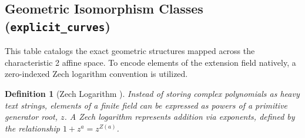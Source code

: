 \documentclass[11pt,letterpaper]{article}
\newtheorem{definition}[theorem]{Definition}
\begin{document}
\subsection{Geometric Isomorphism Classes (\texttt{explicit\_curves})}
This table catalogs the exact geometric structures mapped across the characteristic 2 affine space. To encode elements of the extension field natively, a zero-indexed Zech logarithm convention is utilized.

\begin{definition}[Zech Logarithm \cite{Huber1990}]
Instead of storing complex polynomials as heavy text strings, elements of a finite field can be expressed as powers of a primitive generator root, $z$. A Zech logarithm represents addition via exponents, defined by the relationship $1 + z^a = z^{Z(a)}$. 
\end{definition}
\end{document}
